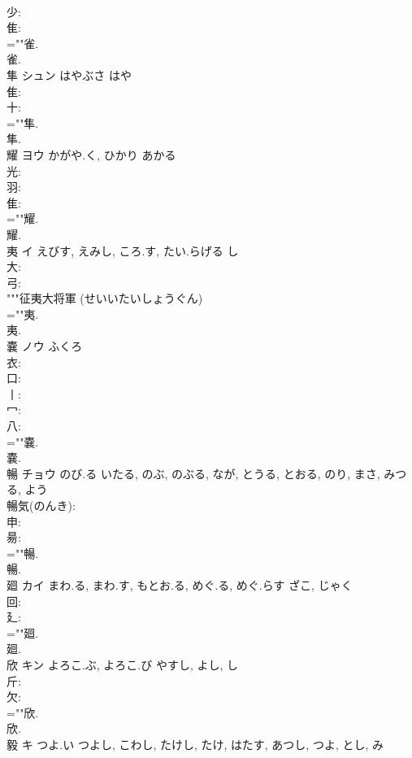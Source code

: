 \documentclass[8pt]{extreport}
\begin{document}
\begin{CJK}{UTF8}{min}
\\	少: 
\\	隹: 
\\	=""雀.
\\	雀.
\\	隼	シュン	はやぶさ	はや	
\\	隹: 
\\	十: 
\\	=""隼.
\\	隼.
\\	耀	ヨウ	かがや.く, ひかり	あかる	
\\	光: 
\\	羽: 
\\	隹: 
\\	=""耀.
\\	耀.
\\	夷	イ	えびす, えみし, ころ.す, たい.らげる	し	
\\	大: 
\\	弓: 
\\	"""征夷大将軍 (せいいたいしょうぐん) 
\\	=""夷.
\\	夷.
\\	嚢	ノウ	ふくろ		
\\	衣: 
\\	口: 
\\	丨: 
\\	冖: 
\\	八: 
\\	=""嚢.
\\	嚢.
\\	暢	チョウ	のび.る	いたる, のぶ, のぶる, なが, とうる, とおる, のり, まさ, みつる, よう	
\\	暢気(のんき): 
\\	申: 
\\	昜: 
\\	=""暢.
\\	暢.
\\	廻	カイ	まわ.る, まわ.す, もとお.る, めぐ.る, めぐ.らす	ざこ, じゃく	
\\	回: 
\\	廴: 
\\	=""廻.
\\	廻.
\\	欣	キン	よろこ.ぶ, よろこ.び	やすし, よし, し	
\\	斤: 
\\	欠: 
\\	=""欣.
\\	欣.
\\	毅	キ	つよ.い	つよし, こわし, たけし, たけ, はたす, あつし, つよ, とし, み	

\end{CJK}
\end{document}
